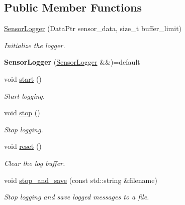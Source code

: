\subsection*{Public Member Functions}
\begin{DoxyCompactItemize}
\item 
\hyperlink{classrobot__interfaces_1_1SensorLogger_aa2b7935cb32b53c49d6c3e541964d968}{Sensor\+Logger} (Data\+Ptr sensor\+\_\+data, size\+\_\+t buffer\+\_\+limit)
\begin{DoxyCompactList}\small\item\em Initialize the logger. \end{DoxyCompactList}\item 
\mbox{\label{classrobot__interfaces_1_1SensorLogger_a1b2121061d96e3f026546f4359cfd769}} 
{\bfseries Sensor\+Logger} (\hyperlink{classrobot__interfaces_1_1SensorLogger}{Sensor\+Logger} \&\&)=default
\item 
void \hyperlink{classrobot__interfaces_1_1SensorLogger_a264f301075b8b4330b35776b3192bee9}{start} ()
\begin{DoxyCompactList}\small\item\em Start logging. \end{DoxyCompactList}\item 
void \hyperlink{classrobot__interfaces_1_1SensorLogger_ac4432aabd2e52401ec02bdcdfbc54e1f}{stop} ()
\begin{DoxyCompactList}\small\item\em Stop logging. \end{DoxyCompactList}\item 
\mbox{\label{classrobot__interfaces_1_1SensorLogger_ab12a1bf654d7d09d3dd498d9d86476f2}} 
void \hyperlink{classrobot__interfaces_1_1SensorLogger_ab12a1bf654d7d09d3dd498d9d86476f2}{reset} ()
\begin{DoxyCompactList}\small\item\em Clear the log buffer. \end{DoxyCompactList}\item 
void \hyperlink{classrobot__interfaces_1_1SensorLogger_a1ab1fc25c3f20624a240430dff78b029}{stop\+\_\+and\+\_\+save} (const std\+::string \&filename)
\begin{DoxyCompactList}\small\item\em Stop logging and save logged messages to a file. \end{DoxyCompactList}\end{DoxyCompactItemize}
